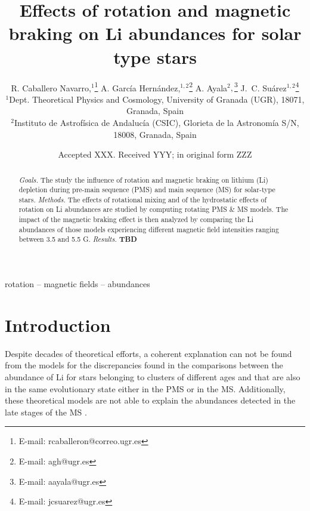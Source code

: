 \documentclass[fleqn,usenatbib]{mnras}
\title[Short title, max. 45 characters]{Effects of rotation and magnetic braking on Li abundances for solar type stars}
\author[R. Caballero Navarro et al.]{
R. Caballero Navarro,$^{1}$\thanks{E-mail: rcaballeron@correo.ugr.es}
A. Garc\'ia Hern\'andez,$^{1,2}$\thanks{E-mail: agh@ugr.es}
A. Ayala$^{2},$\thanks{E-mail: aayala@ugr.es}
J.~C. Su\'arez$^{1,2}$\thanks{E-mail: jcsuarez@ugr.es}
\\
$^{1}$Dept. Theoretical Physics and Cosmology, University of Granada (UGR), 18071, Granada, Spain\\
$^{2}$Instituto de Astrof\'isica de Andaluc\'ia (CSIC), Glorieta de la Astronom\'ia S/N, 18008, Granada, Spain\\
}
\date{Accepted XXX. Received YYY; in original form ZZZ}
\begin{document}
\label{firstpage}
\pagerange{\pageref{firstpage}--\pageref{lastpage}}
\maketitle

\begin{abstract}
\textit{Goals.} The study the influence of rotation and magnetic braking on lithium (Li) depletion during pre-main sequence (PMS) and main sequence (MS) for solar-type stars.
\newline\textit{Methods.} The effects of rotational mixing and of the hydrostatic effects of rotation on Li abundances are studied by computing rotating PMS \& MS models. The impact of the magnetic braking effect is then analyzed by comparing the Li abundances of those models experiencing different magnetic field intensities ranging between 3.5 and 5.5 G.
\newline\textit{Results.} \textbf{TBD}
\end{abstract}

\begin{keywords}
rotation -- magnetic fields -- abundances
\end{keywords}



\section{Introduction}
Despite decades of theoretical efforts, a coherent explanation can not be found from the models for the discrepancies found in the comparisons between the abundance of Li for stars belonging to clusters of different ages and that are also in the same evolutionary state either in the PMS or in the MS. Additionally, these theoretical models are not able to explain the abundances detected in the late stages of the MS \citep{Tschape2001}.\par
\end{document}

